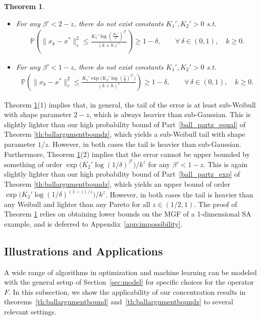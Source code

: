 \documentclass{article}
\newtheorem{theorem}{Theorem}[section]
\begin{document}
\begin{theorem}\label{thm:impossibility}
    $ $
    \begin{itemize}
        \item[(1)] For any $\beta'<2-z$, there do not exist constants $K_1',K_2'>0$ s.t. 
        \begin{align*}
            \mathbb{P}\left(\|x_k-x^*\|_c^2 \leq \frac{K_1'\log\left(\frac{K_2'}{\delta}\right)^{\beta'}}{(k+h)^z} \right) \geq 1- \delta,\qquad \forall\,\delta\in(0,1), \quad k\geq 0.
        \end{align*}
        \item[(2)] For any $\beta'<1-z$, there do not exist constants $K_1',K_2'>0$ s.t. 
        \begin{align*}
            \mathbb{P}\left(\|x_k-x^*\|_c^2 \leq \frac{K_1' \exp\Big(K_2'\log\left(\frac{1}{\delta}\right)^{\beta'}\Big)}{(k+h)^z} \right) \geq 1- \delta,\qquad \forall\,\delta\in(0,1), \quad k\geq 0.
        \end{align*}
    \end{itemize}
\end{theorem}
Theorem \ref{thm:impossibility}(1) implies that, in general, the tail of the error is at least sub-Weibull with shape parameter $2-z$, which is always heavier than sub-Gaussian. This is slightly lighter than our high probability bound of Part~\ref{ball_partz_equal} of Theorem \ref{th:ballargumentboundz}, which yields a sub-Weibull tail with shape parameter $1/z$. However, in both cases the tail is heavier than sub-Gaussian. Furthermore, Theorem \ref{thm:impossibility}(2) implies that the error cannot be upper bounded by something of order $\exp\big(K_2'\log\left(1/\delta\right)^{\beta'}\big)/k^z$ for any $\beta'<1-z$. This is again slightly lighter than our high probability bound of Part~\ref{ball_partz_exp} of Theorem \ref{th:ballargumentboundz}, which yields an upper bound of order $\exp\big(K_2'\log(1/\delta)^{(1-z)/z}\big)/k^z$. However, in both cases the tail is heavier than any Weibull and lighter than any Pareto for all $z\in (1/2,1)$. The proof of Theorem \ref{thm:impossibility} relies on obtaining lower bounds on the MGF of a 1-dimensional SA example, and is deferred to Appendix~\ref{app:impossibility}. 







\subsection{Illustrations and Applications}\label{sec:illustrations}
A wide range of algorithms in optimization and machine learning %
can be modeled with the general setup of Section~\ref{sec:model} for specific choices for the operator $F$. In this subsection, we show the applicability of our concentration results in theorems~\ref{th:ballargumentbound} and~\ref{th:ballargumentboundz} to several relevant settings.
\end{document}
